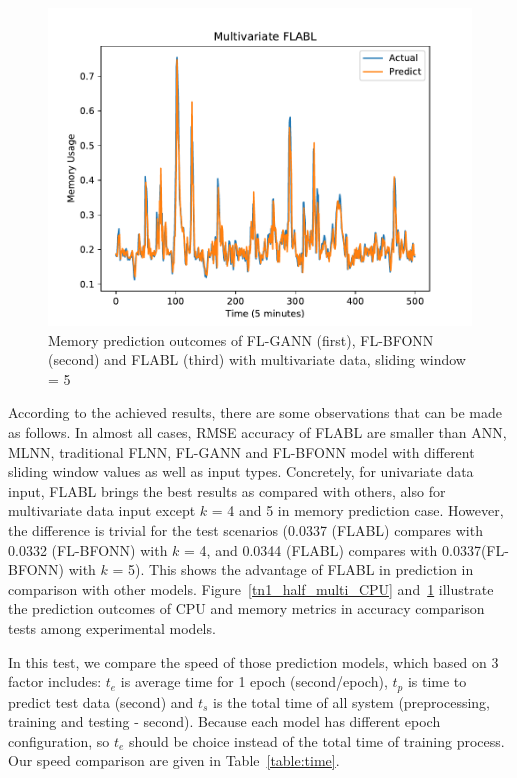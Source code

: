 \documentclass[runningheads]{llncs}
\begin{document}
\begin{figure}[!h]
\begin{minipage}[t]{4cm}
		\includegraphics[width=1\textwidth =0cm 0cm 0cm 0cm]{images/pdf/multi_ram_flabl.pdf}
	\end{minipage}
	\caption{Memory prediction outcomes of FL-GANN (first), FL-BFONN (second) and FLABL (third) with multivariate data, sliding window = 5} 
	\label{tn1_half_multi_RAM}
\end{figure}

According to the achieved results, there are some observations that can be made as follows. In almost all cases, RMSE accuracy of FLABL are smaller than ANN, MLNN, traditional FLNN, FL-GANN and FL-BFONN model with different sliding window values as well as input types. Concretely, for univariate data input, FLABL brings the best results as compared with others, also for multivariate data input except $k$ = 4 and 5 in memory prediction case. However, the difference is trivial for the test scenarios (0.0337 (FLABL) compares with 0.0332 (FL-BFONN) with $k$ = 4, and 0.0344 (FLABL) compares with 0.0337(FL-BFONN) with $k$ = 5). This shows the advantage of FLABL in prediction in comparison with other models. Figure~\ref{tn1_half_multi_CPU} and~\ref{tn1_half_multi_RAM} illustrate the prediction outcomes of CPU and memory metrics in accuracy comparison tests among experimental models.

In this test, we compare the speed of those prediction models, which based on 3 factor includes: $t_e$ is average time for 1 epoch (second/epoch), $t_p$ is time to predict test data (second) and $t_s$ is the total time of all system (preprocessing, training and testing - second). Because each model has different epoch configuration, so $t_e$ should be choice instead of the total time of training process.  Our speed comparison are given in Table~\ref{table:time}.
\end{document}
